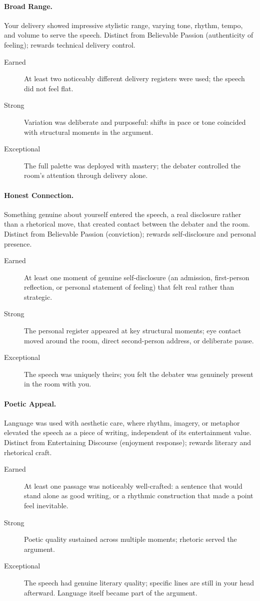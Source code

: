 \paragraph{Broad Range.} Your delivery showed impressive stylistic range, varying tone, rhythm, tempo, and volume to serve the speech. Distinct from Believable Passion (authenticity of feeling); rewards technical delivery control.
\begin{description}
    \item[Earned] At least two noticeably different delivery registers were used; the speech did not feel flat.
    \item[Strong] Variation was deliberate and purposeful: shifts in pace or tone coincided with structural moments in the argument.
    \item[Exceptional] The full palette was deployed with mastery; the debater controlled the room's attention through delivery alone.
\end{description}

\paragraph{Honest Connection.} Something genuine about yourself entered the speech, a real disclosure rather than a rhetorical move, that created contact between the debater and the room. Distinct from Believable Passion (conviction); rewards self-disclosure and personal presence.
\begin{description}
    \item[Earned] At least one moment of genuine self-disclosure (an admission, first-person reflection, or personal statement of feeling) that felt real rather than strategic.
    \item[Strong] The personal register appeared at key structural moments; eye contact moved around the room, direct second-person address, or deliberate pause.
    \item[Exceptional] The speech was uniquely theirs; you felt the debater was genuinely present in the room with you.
\end{description}

\paragraph{Poetic Appeal.} Language was used with aesthetic care, where rhythm, imagery, or metaphor elevated the speech as a piece of writing, independent of its entertainment value. Distinct from Entertaining Discourse (enjoyment response); rewards literary and rhetorical craft.
\begin{description}
    \item[Earned] At least one passage was noticeably well-crafted: a sentence that would stand alone as good writing, or a rhythmic construction that made a point feel inevitable.
    \item[Strong] Poetic quality sustained across multiple moments; rhetoric served the argument.
    \item[Exceptional] The speech had genuine literary quality; specific lines are still in your head afterward. Language itself became part of the argument.
\end{description}

